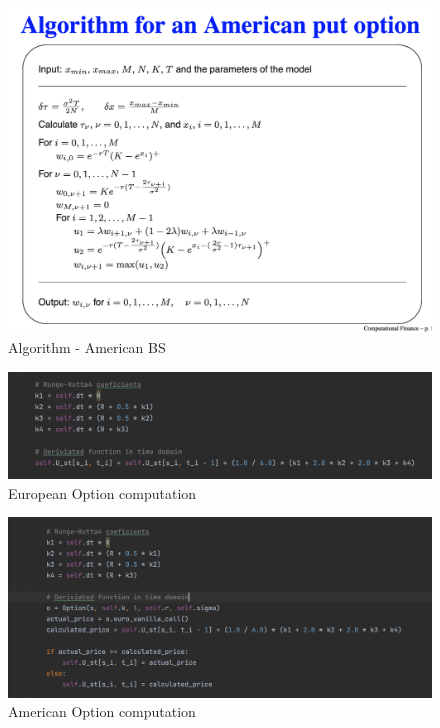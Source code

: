 \documentclass[10pt,a4paper]{article}
\begin{document}
	
	\begin{figure}[H]
		\centering
		\includegraphics[width = 1.0\linewidth]{palczewski.png}
		\caption[Algorithm - American BS]{Algorithm - American BS}
		\label{fig:Al}
	\end{figure}
	
	\begin{figure}[H]
		\centering
		\includegraphics[width = 1.0\linewidth]{european.png}
		\caption[European Option computation]{European Option computation}
		\label{fig:Eu}
	\end{figure}

	\begin{figure}[H]
		\centering
		\includegraphics[width = 1.0\linewidth]{american.png}
		\caption[American Option computation]{American Option computation}
		\label{fig:Am}
	\end{figure}
	
\end{document}
